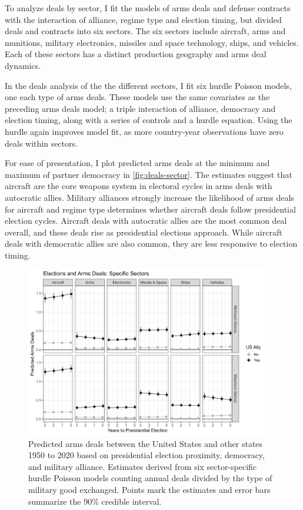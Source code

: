 \documentclass[12pt]{article}
\begin{document}
To analyze deals by sector, I fit the models of arms deals and defense contracts with the interaction of alliance, regime type and election timing, but divided deals and contracts into six sectors. 
The six sectors include aircraft, arms and munitions, military electronics, missiles and space technology, ships, and vehicles.  
Each of these sectors has a distinct production geography and arms deal dynamics.


In the deals analysis of the the different sectors, I fit six hurdle Poisson models, one each type of arms deals. 
These models use the same covariates as the preceding arms deals model; a triple interaction of alliance, democracy and election timing, along with a series of controls and a hurdle equation.
Using the hurdle again improves model fit, as more country-year observations have zero deals within sectors. 


For ease of presentation, I plot predicted arms deals at the minimum and maximum of partner democracy in \autoref{fig:deals-sector}.
The estimates suggest that aircraft are the core weapons system in electoral cycles in arms deals with autocratic allies. 
Military alliances strongly increase the likelihood of arms deals for aircraft and regime type determines whether aircraft deals follow presidential election cycles. 
Aircraft deals with autocratic allies are the most common deal overall, and these deals rise as presidential elections approach. 
While aircraft deals with democratic allies are also common, they are less responsive to election timing. 



\begin{figure}[htpb]
	\centering
		\includegraphics[width=0.95\textwidth]{../figures/deals-sector.png}
	\caption{Predicted arms deals between the United States and other states 1950 to 2020 based on presidential election proximity, democracy, and military alliance. Estimates derived from six sector-specific hurdle Poisson models counting annual deals divided by the type of military good exchanged. Points mark the estimates and error bars summarize the 90\% credible interval.}
	\label{fig:deals-sector}
\end{figure}
\end{document}
